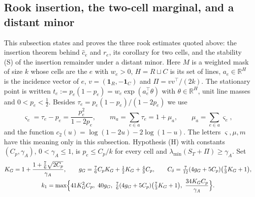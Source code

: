\subsection{Rook insertion, the two-cell marginal, and a distant minor}\label{app:insercion}
This subsection states and proves the three rook estimates quoted above: the insertion theorem behind
$\hat c_e$ and $r_e$, its corollary for two cells, and the stability (S) of the insertion remainder under
a distant minor. Here $M$ is a weighted mask of size $k$ whose cells are the $e$ with $w_e>0$, $H=R\sqcup
C$ is its set of lines, $a_e\in\mathbb R^H$ is the incidence vector of $e$, $v=(\mathbf1_R,-\mathbf1_C)$ and
$\Pi=vv^\top/(2k)$. The stationary point is written $t_e:=p_e(1-p_e)=w_e\exp(a_e^\top\theta)$ with
$\theta\in\mathbb R^H$, unit line masses and $0<p_e<\tfrac12$. Besides $\tau_e=p_e(1-p_e)/(1-2p_e)$ we use
\[
 \varsigma_e=\tau_e-p_e=\frac{p_e^2}{1-2p_e},\qquad m_a=\sum_{e\in a}\tau_e=1+\mu_a,\qquad
 \mu_a=\sum_{e\in a}\varsigma_e,
\]
and the function $c_2(u)=\log(1-2u)-2\log(1-u)$. The letters $\varsigma,\mu,m$ have this meaning only in
this subsection. Hypothesis (H) with constants
$(C_p,\gamma_A)$, $0<\gamma_A\le1$, is $p_e\le C_p/k$ for every cell and
$\lambda_{\min}(S_T+\Pi)\ge\gamma_A$. Set
\begin{gather*}
 K_G=1+\frac{1+\frac76\sqrt{2C_p}}{\gamma_A},\qquad g_G=\tfrac76C_pK_G+\tfrac12K_G+\tfrac43C_p,\qquad
 C_\delta=\tfrac7{12}(4g_G+5C_p)\bigl(\tfrac73K_G+1\bigr),\\
 k_1=\max\Bigl\{41K_G^2C_p,\ 40g_G,\ \tfrac76(4g_G+5C_p)\bigl(\tfrac73K_G+1\bigr),\
            \frac{34K_GC_p}{\gamma_A}\Bigr\}.
\end{gather*}

